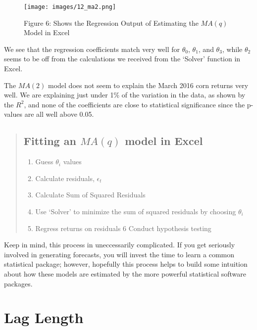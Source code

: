 \documentclass[
]{book}
\providecommand{\tightlist}{%
  \setlength{\itemsep}{0pt}\setlength{\parskip}{0pt}}
\begin{document}
\begin{figure}
\centering
\texttt{[image: images/12\_ma2.png]}
\caption{Figure 6: Shows the Regression Output of Estimating the \(MA(q)\) Model in Excel}
\end{figure}

We see that the regression coefficients match very well for \(\theta_0\), \(\theta_1\), and \(\theta_3\), while \(\theta_2\) seems to be off from the calculations we received from the `Solver' function in Excel.

The \(MA(2)\) model does not seem to explain the March 2016 corn returns very well. We are explaining just under 1\% of the variation in the data, as shown by the \(R^2\), and none of the coefficients are close to statistical significance since the p-values are all well above 0.05.

\begin{quote}
\hypertarget{fitting-an-maq-model-in-excel}{%
\subsection{\texorpdfstring{Fitting an \(MA(q)\) model in Excel}{Fitting an MA(q) model in Excel}}\label{fitting-an-maq-model-in-excel}}

\begin{enumerate}
\def\labelenumi{\arabic{enumi}.}
\tightlist
\item
  Guess \(\theta_i\) values
\item
  Calculate residuals, \(\epsilon_t\)
\item
  Calculate Sum of Squared Residuals
\item
  Use `Solver' to minimize the sum of squared residuals by choosing \(\theta_i\)
\item
  Regress returns on residuals 6 Conduct hypothesis testing
\end{enumerate}
\end{quote}

Keep in mind, this process in uneccessarily complicated. If you get seriously involved in generating forecasts, you will invest the time to learn a common statistical package; however, hopefully this process helps to build some intuition about how these models are estimated by the more powerful statistical software packages.

\hypertarget{lag-length}{%
\section{Lag Length}\label{lag-length}}
\end{document}
